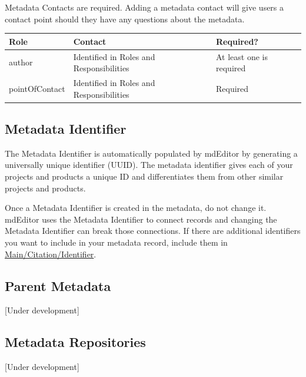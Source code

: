 \documentclass[
]{book}
\makeatletter
\newenvironment{kframe}{%
\medskip{}
\setlength{\fboxsep}{.8em}
 \def\at@end@of@kframe{}%
 \ifinner\ifhmode%
  \def\at@end@of@kframe{\end{minipage}}%
  \begin{minipage}{\columnwidth}%
 \fi\fi%
 \def\FrameCommand##1{\hskip\@totalleftmargin \hskip-\fboxsep
 \colorbox{shadecolor}{##1}\hskip-\fboxsep
     \hskip-\linewidth \hskip-\@totalleftmargin \hskip\columnwidth}%
 \MakeFramed {\advance\hsize-\width
   \@totalleftmargin\z@ \linewidth\hsize
   \@setminipage}}%
 {\par\unskip\endMakeFramed%
 \at@end@of@kframe}
\newenvironment{rmdblock}[1]
  {
  \begin{itemize}
  \renewcommand{\labelitemi}{
    \raisebox{-.7\height}[0pt][0pt]{
      {\setkeys{Gin}{width=3em,keepaspectratio}\texttt{[image: images/\#1]}}
    }
  }
  \setlength{\fboxsep}{1em}
  \begin{kframe}
  \item
  }
  {
  \end{kframe}
  \end{itemize}
  }
\newenvironment{rmdcaution}
  {\begin{rmdblock}{caution}}
  {\end{rmdblock}}
\makeatother
\begin{document}
Metadata Contacts are required. Adding a metadata contact will give users a contact point should they have any questions about the metadata.

\begin{longtable}[]{@{}lll@{}}
\toprule
Role & Contact & Required?\tabularnewline
\midrule
\endhead
author & Identified in Roles and Responsibilities & At least one is required\tabularnewline
pointOfContact & Identified in Roles and Responsibilities & Required\tabularnewline
\bottomrule
\end{longtable}

\hypertarget{metadata-identifier}{%
\subsection*{Metadata Identifier}\label{metadata-identifier}}

The Metadata Identifier is automatically populated by mdEditor by generating a universally unique identifier (UUID). The metadata identifier gives each of your projects and products a unique ID and differentiates them from other similar projects and products.

\begin{rmdcaution}
Once a Metadata Identifier is created in the metadata, do not change it.
mdEditor uses the Metadata Identifier to connect records and changing
the Metadata Identifier can break those connections. If there are
additional identifiers you want to include in your metadata record,
include them in
\protect\hyperlink{project-main}{Main/Citation/Identifier}.
\end{rmdcaution}

\hypertarget{parent-metadata}{%
\subsection*{Parent Metadata}\label{parent-metadata}}

{[}Under development{]}

\hypertarget{metadata-repositories}{%
\subsection*{Metadata Repositories}\label{metadata-repositories}}

{[}Under development{]}
\end{document}

